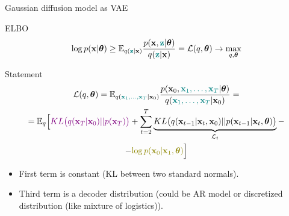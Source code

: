 \begin{frame}{Gaussian diffusion model as VAE}
	\begin{block}{ELBO}
		\vspace{-0.4cm}
		\[
			\log p(\mathbf{x} | \boldsymbol{\theta}) \geq \mathbb{E}_{q({\color{teal}\mathbf{z}} | \mathbf{x})} \frac{p(\mathbf{x}, {\color{teal}\mathbf{z}} | \boldsymbol{\theta})}{q({\color{teal}\mathbf{z}} | \mathbf{x})} = \mathcal{L}(q, \boldsymbol{\theta}) \rightarrow \max_{q, \boldsymbol{\theta}}
		\]
		\vspace{-0.5cm}
	\end{block}
	\begin{block}{Statement}
		\vspace{-0.8cm}
		\begin{multline*}
			\cL(q, \btheta) = \bbE_{q({\color{teal}\bx_1, \dots, \bx_T} | \bx_0)}\frac{p(\bx_0, {\color{teal}\bx_1, \dots, \bx_T} | \btheta)}{q({\color{teal}\bx_1, \dots, \bx_T} | \bx_0)} = \\ 
			= \bbE_{q} \Bigl[ {\color{violet}KL\bigl(q(\bx_T | \bx_0) || p(\bx_T)\bigr)}
			+ \sum_{t=2}^T \underbrace{KL \bigl(q(\bx_{t-1} | \bx_t, \bx_0) || p(\bx_{t - 1} | \bx_t, \btheta )\bigr)}_{\cL_t} - \\
			- {\color{olive}\log p(\bx_0 | \bx_1, \btheta)} \Bigr]
		\end{multline*}
		\vspace{-0.5cm}
	\end{block}
	\begin{itemize}
		\item {\color{violet}First term} is constant (KL between two standard normals).
		\item {\color{olive}Third term} is a decoder distribution (could be AR model or discretized distribution (like mixture of logistics)). 
	\end{itemize}
\end{frame}
